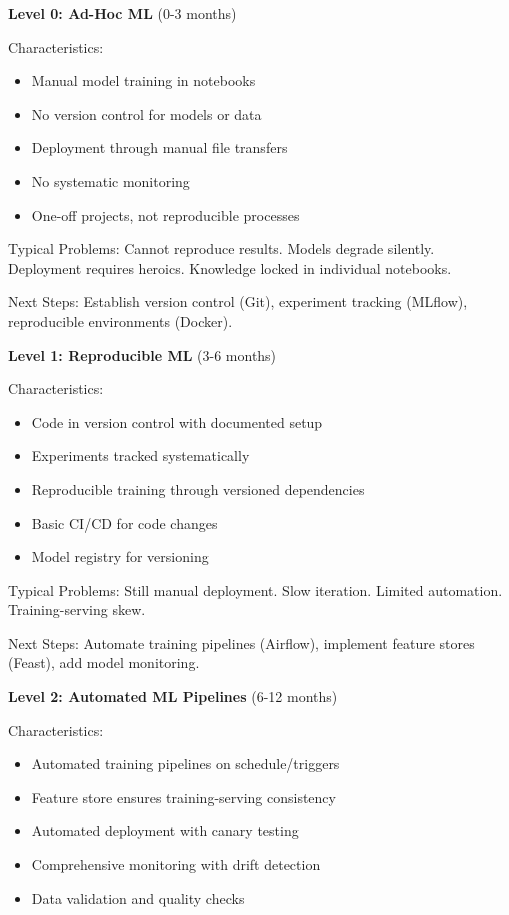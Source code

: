 \textbf{Level 0: Ad-Hoc ML} (0-3 months)

Characteristics:
\begin{itemize}
    \item Manual model training in notebooks
    \item No version control for models or data
    \item Deployment through manual file transfers
    \item No systematic monitoring
    \item One-off projects, not reproducible processes
\end{itemize}

Typical Problems: Cannot reproduce results. Models degrade silently. Deployment requires heroics. Knowledge locked in individual notebooks.

Next Steps: Establish version control (Git), experiment tracking (MLflow), reproducible environments (Docker).

\textbf{Level 1: Reproducible ML} (3-6 months)

Characteristics:
\begin{itemize}
    \item Code in version control with documented setup
    \item Experiments tracked systematically
    \item Reproducible training through versioned dependencies
    \item Basic CI/CD for code changes
    \item Model registry for versioning
\end{itemize}

Typical Problems: Still manual deployment. Slow iteration. Limited automation. Training-serving skew.

Next Steps: Automate training pipelines (Airflow), implement feature stores (Feast), add model monitoring.

\textbf{Level 2: Automated ML Pipelines} (6-12 months)

Characteristics:
\begin{itemize}
    \item Automated training pipelines on schedule/triggers
    \item Feature store ensures training-serving consistency
    \item Automated deployment with canary testing
    \item Comprehensive monitoring with drift detection
    \item Data validation and quality checks
\end{itemize}

